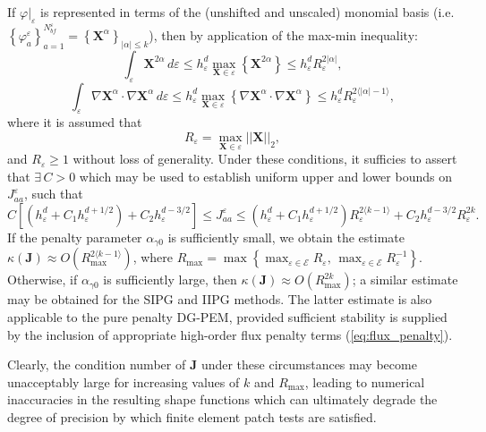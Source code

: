 If $\varphi|_{\varepsilon}$ is represented in terms of the (unshifted and unscaled) monomial basis (i.e. $\left\{ \varphi_a^\varepsilon \right\}_{a=1}^{N^\varepsilon_{bf}} = \left\{ \mathbf{X}^\alpha \right\}_{|\alpha| \leq k}$), then by application of the max-min inequality:
\begin{equation}
	\int_{\varepsilon} \mathbf{X}^{2\alpha} \, d \varepsilon \leq h_{\varepsilon}^d \max_{\mathbf{X} \in \varepsilon} \left\{ \mathbf{X}^{2\alpha} \right\} \leq h_{\varepsilon}^d R_{\varepsilon}^{2|\alpha|},
\end{equation}
\begin{equation}
	\int_{\varepsilon} \nabla \mathbf{X}^{\alpha} \cdot \nabla \mathbf{X}^{\alpha} \, d \varepsilon \leq h_{\varepsilon}^d \max_{\mathbf{X} \in \varepsilon} \left\{ \nabla \mathbf{X}^{\alpha} \cdot \nabla \mathbf{X}^{\alpha} \right\} \leq h_{\varepsilon}^d R_{\varepsilon}^{2\langle|\alpha|-1\rangle},
\end{equation}
where it is assumed that
\begin{equation}
	R_\varepsilon = \max_{\mathbf{X} \in \varepsilon} || \mathbf{X} ||_2,
\end{equation}
and $R_\varepsilon \geq 1$ without loss of generality. Under these conditions, it sufficies to assert that $\exists \, C > 0$ which may be used to establish uniform upper and lower bounds on $J^{\varepsilon}_{aa}$, such that
\begin{equation}
	C \left[ (h_\varepsilon^{d} + C_1 h_\varepsilon^{d+1/2}) + C_2 h_\varepsilon^{d-3/2} \right] \leq J^{\varepsilon}_{aa} \leq (h_\varepsilon^{d} + C_1 h_\varepsilon^{d+1/2}) R_{\varepsilon}^{2\langle k-1 \rangle} + C_2 h_\varepsilon^{d-3/2} R_{\varepsilon}^{2k}.
\end{equation}
If the penalty parameter $\alpha_{\gamma0}$ is sufficiently small, we obtain the estimate $\kappa (\mathbf{J}) \approx O(R_{\max}^{2\langle k-1 \rangle})$, where $R_{\max} = \max \left\{ \max_{\varepsilon \in \mathcal{E}} R_\varepsilon, \, \max_{\varepsilon \in \mathcal{E}} R_\varepsilon^{-1} \right\}$. Otherwise, if $\alpha_{\gamma0}$ is sufficiently large, then $\kappa (\mathbf{J}) \approx O(R_{\max}^{2k})$; a similar estimate may be obtained for the SIPG and IIPG methods. The latter estimate is also applicable to the pure penalty DG-PEM, provided sufficient stability is supplied by the inclusion of appropriate high-order flux penalty terms (\ref{eq:flux_penalty}).

Clearly, the condition number of $\mathbf{J}$ under these circumstances may become unacceptably large for increasing values of $k$ and $R_{\max}$, leading to numerical inaccuracies in the resulting shape functions which can ultimately degrade the degree of precision by which finite element patch tests are satisfied.

